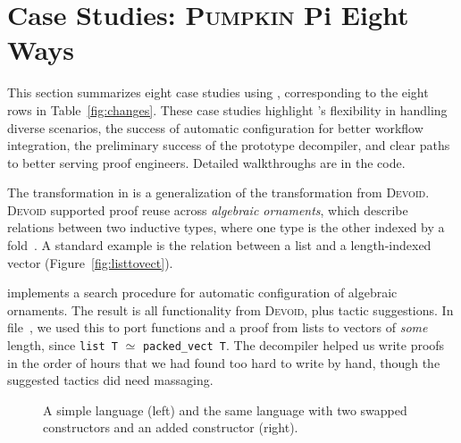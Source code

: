 \section{Case Studies: \textsc{Pumpkin P}i Eight Ways}
\label{sec:search}

This section summarizes eight case studies using \toolname,
corresponding to the eight rows in Table~\ref{fig:changes}.
These case studies highlight \toolname's flexibility in handling diverse scenarios,
the success of automatic configuration for better workflow integration, %
the preliminary success of the prototype decompiler,
and clear paths to better serving proof engineers.
Detailed walkthroughs are in the code.

The transformation in \toolname is a generalization of the transformation from \textsc{Devoid}.
\textsc{Devoid} supported proof reuse across \textit{algebraic ornaments}, which describe relations
between two inductive types, where one type is the other indexed by a fold~\cite{mcbride}.
A standard example is the relation between a list and a
length-indexed vector (Figure~\ref{fig:listtovect}).

\toolname implements a search procedure for automatic configuration of algebraic ornaments.
The result is all functionality from \textsc{Devoid}, plus tactic suggestions.
In file~\href{https://github.com/uwplse/pumpkin-pi/blob/v2.0.0/plugin/coq/examples/Example.v}{}, we used this to port
functions and a proof from lists to vectors of \textit{some} length, since \lstinline{list T} $\simeq$ \lstinline{packed_vect T}.
The decompiler helped us write proofs in the order of hours that we had found
too hard to write by hand,
though the suggested tactics did need massaging.

\begin{figure*}
\begin{minipage}{0.48\textwidth}
   
\end{minipage}
\hfill
\begin{minipage}{0.48\textwidth}
   
\end{minipage}
\vspace{-0.4cm}
\caption{A simple language (left) and the same language with two swapped constructors and an added constructor (right).}
\label{fig:replica}
\end{figure*}

